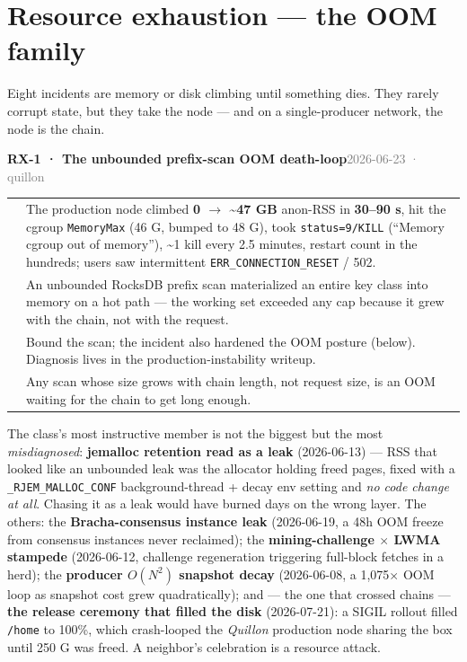 \documentclass[10pt,a4paper]{article}
\makeatletter
\newcommand{\measured}[1]{\textcolor{sigilcyan}{\textbf{#1}}}
\newcommand{\svM}{{\scriptsize\textcolor{sigilamber}{\textsc{major}}}}
\newcommand{\rsFixed}{{\scriptsize\textcolor{sigilcyan}{\textsc{guarded}}}}
\newcommand{\frow}[2]{{\footnotesize\textcolor{gray}{\textsc{#1}}}\;&\small #2\\}
\newenvironment{failentry}[5]{%
\begin{tcolorbox}[enhanced,breakable,colback=white,colframe=slate,boxrule=0.6pt,arc=2pt,
  left=8pt,right=8pt,top=6pt,bottom=6pt,
  borderline west={3pt}{0pt}{sigilamber!70!slate}]
{\small\textbf{#1 · #2}\hfill{\footnotesize\textcolor{gray}{#3}}\quad#4\quad#5}\\[4pt]
\begin{tabular}{@{}>{\raggedleft\arraybackslash}p{1.8cm}p{13.2cm}@{}}
}{%
\end{tabular}
\end{tcolorbox}\vspace{2pt}}
\makeatother
\begin{document}
\section{Resource exhaustion — the OOM family}\label{sec:oom}

Eight incidents are memory or disk climbing until something dies. They rarely corrupt
state, but they take the node — and on a single-producer network, the node is the chain.

\begin{failentry}{RX-1}{The unbounded prefix-scan OOM death-loop}{2026-06-23 · quillon}{\svM}{\rsFixed}
\frow{symptom}{The production node climbed \measured{0 $\to$ \textasciitilde47 GB} anon-RSS
in \measured{30--90 s}, hit the cgroup \texttt{MemoryMax} (46 G, bumped to 48 G), took
\texttt{status=9/KILL} (``Memory cgroup out of memory''), \textasciitilde1 kill every 2.5
minutes, restart count in the hundreds; users saw intermittent
\texttt{ERR\_CONNECTION\_RESET} / 502.}
\frow{root cause}{An unbounded RocksDB prefix scan materialized an entire key class into
memory on a hot path — the working set exceeded any cap because it grew with the chain,
not with the request.}
\frow{guard}{Bound the scan; the incident also hardened the OOM posture (below). Diagnosis
lives in the production-instability writeup.}
\frow{lesson}{Any scan whose size grows with chain length, not request size, is an
OOM waiting for the chain to get long enough.}
\end{failentry}

The class's most instructive member is not the biggest but the most \emph{misdiagnosed}:
\textbf{jemalloc retention read as a leak} (2026-06-13) — RSS that looked like an
unbounded leak was the allocator holding freed pages, fixed with a
\texttt{\_RJEM\_MALLOC\_CONF} background-thread + decay env setting and \emph{no code
change at all}. Chasing it as a leak would have burned days on the wrong layer. The
others: the \textbf{Bracha-consensus instance leak} (2026-06-19, a 48h OOM freeze from
consensus instances never reclaimed); the \textbf{mining-challenge $\times$ LWMA
stampede} (2026-06-12, challenge regeneration triggering full-block fetches in a herd);
the \textbf{producer $O(N^2)$ snapshot decay} (2026-06-08, a 1{,}075$\times$ OOM loop as
snapshot cost grew quadratically); and — the one that crossed chains —
\textbf{the release ceremony that filled the disk} (2026-07-21): a SIGIL rollout filled
\texttt{/home} to 100\%, which crash-looped the \emph{Quillon} production node sharing the
box until 250 G was freed. A neighbor's celebration is a resource attack.
\end{document}
